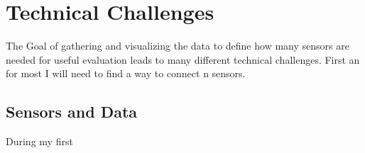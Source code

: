 \chapter*{Technical Challenges}
\label{chap:Technical CHallenges}
\renewcommand{\thesection}{\arabic{section}}
\setcounter{section}{0}

The Goal of gathering and visualizing the data to define how many sensors are needed for useful evaluation leads to many different technical challenges. First an for most I will need to find a way to connect n sensors.


\section{Sensors and Data}

During my first 